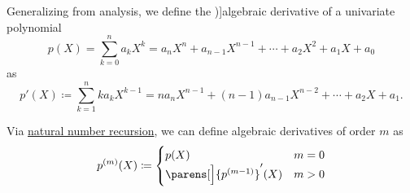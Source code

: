 \begin{definition}\label{def:algebraic_derivative}
  Generalizing  from analysis, we define the \term[ru=(алгебрическая) производная (\cite[sec. D17.1]{Тыртышников2007})]{algebraic derivative} of a univariate polynomial
  \begin{equation*}
    p(X) = \sum_{k=0}^n a_k X^k = a_n X^n + a_{n-1} X^{n-1} + \cdots + a_2 X^2 + a_1 X + a_0
  \end{equation*}
  as
  \begin{equation*}
    p'(X) \coloneqq \sum_{k=1}^n k a_k X^{k-1} = n a_n X^{n-1} + (n-1) a_{n-1} X^{n-2} + \cdots + a_2 X + a_1.
  \end{equation*}

  Via \hyperref[rem:natural_number_recursion]{natural number recursion}, we can define algebraic derivatives of order \( m \) as
  \begin{equation*}
    p^{(m)}(X) \coloneqq \begin{cases}
      p(X)              &m = 0 \\
      \parens[\Big]{ p^{(m - 1)} }'(X) &m > 0
    \end{cases}
  \end{equation*}
\end{definition}

